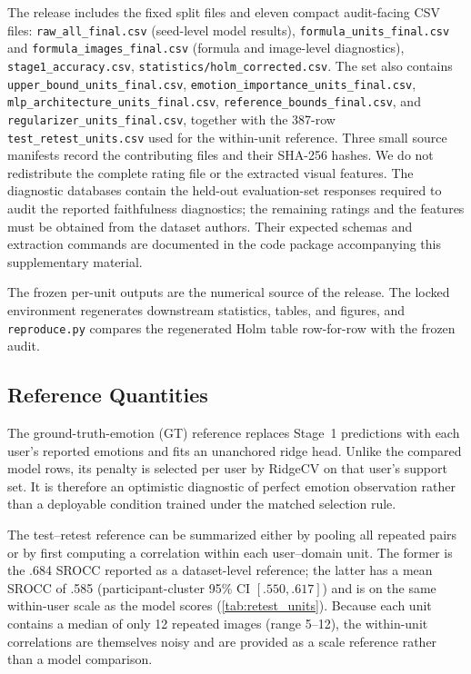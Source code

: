 \documentclass[10pt,twocolumn,letterpaper]{article}
\begin{document}
The release includes the fixed split files and eleven compact audit-facing
CSV files:
\texttt{raw\_all\_final.csv} (seed-level model results),
\texttt{formula\_units\_final.csv} and
\texttt{formula\_images\_final.csv} (formula and image-level diagnostics),
\texttt{stage1\_accuracy.csv},
\texttt{statistics/holm\_corrected.csv}. The set also contains
\texttt{upper\_bound\_units\_final.csv},
\texttt{emotion\_importance\_units\_final.csv},
\texttt{mlp\_architecture\_units\_final.csv},
\texttt{reference\_bounds\_final.csv}, and
\texttt{regularizer\_units\_final.csv}, together with the 387-row
\texttt{test\_retest\_units.csv} used for the within-unit reference.
Three small source manifests record the contributing files and their SHA-256
hashes. We do not redistribute the complete rating file or the extracted
visual features. The diagnostic databases contain the held-out evaluation-set
responses required to audit the reported faithfulness diagnostics; the
remaining ratings and the features must be obtained from the dataset authors.
Their expected schemas and extraction commands are documented in the code
package accompanying this supplementary material.


The frozen per-unit outputs are the numerical source of the release. The locked
environment regenerates downstream statistics, tables, and figures, and
\texttt{reproduce.py} compares the regenerated Holm table row-for-row with the
frozen audit.

\subsection{Reference Quantities}

The ground-truth-emotion (GT) reference replaces Stage~1 predictions with each
user's reported emotions and fits an unanchored ridge head. Unlike the compared
model rows, its penalty is selected per user by RidgeCV on that user's support
set. It is therefore an optimistic diagnostic of perfect emotion observation
rather than a deployable condition trained under the matched selection rule.

The test--retest reference can be summarized either by pooling all repeated
pairs or by first computing a correlation within each user--domain unit. The
former is the .684 SROCC reported as a dataset-level reference; the latter
has a mean SROCC of .585 (participant-cluster 95\% CI $[.550,.617]$) and is on
the same within-user scale as the model scores (\cref{tab:retest_units}).
Because each unit contains a median of only 12 repeated images (range 5--12),
the within-unit correlations are themselves noisy and are provided as a scale
reference rather than a model comparison.
\end{document}
